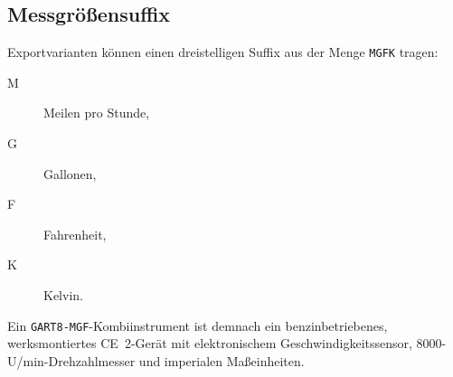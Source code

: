 \subsection{Messgrößensuffix}
Exportvarianten können einen dreistelligen Suffix aus der Menge \texttt{MGFK} tragen:
\begin{description}
    \item[M] Meilen pro Stunde,
    \item[G] Gallonen,
    \item[F] Fahrenheit,
    \item[K] Kelvin.
\end{description}
Ein \texttt{GART8-MGF}-Kombiinstrument ist demnach ein benzinbetriebenes, werksmontiertes CE~2-Gerät mit elektronischem Geschwindigkeitssensor, 8000-U/min-Drehzahlmesser und imperialen Maßeinheiten.

